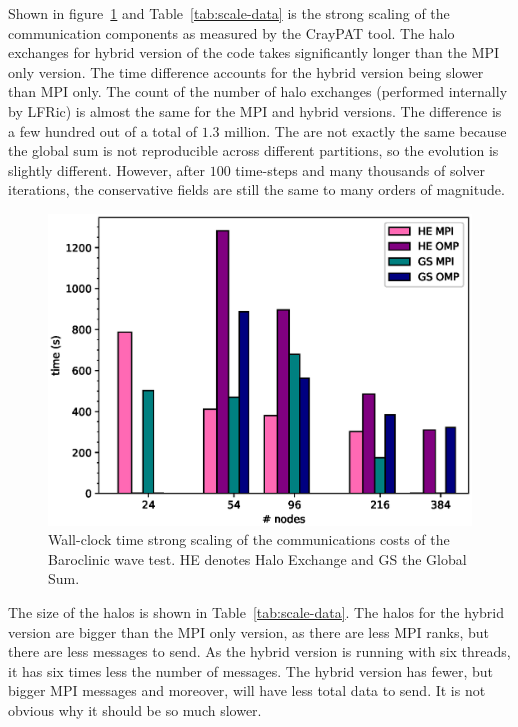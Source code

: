 Shown in figure~\ref{fig:comms_scale} and Table~\ref{tab:scale-data}
is the strong scaling of the communication components as measured by
the CrayPAT tool. The halo exchanges for hybrid version of the code
takes significantly longer than the MPI only version. The time
difference accounts for the hybrid version being slower than MPI only.
The count of the number of halo exchanges (performed internally by
LFRic) is almost the same for the MPI and hybrid versions. The
difference is a few hundred out of a total of $1.3$ million. The are
not exactly the same because the global sum is not reproducible across
different partitions, so the evolution is slightly different. However,
after $100$ time-steps and many thousands of solver iterations, the
conservative fields are still the same to many orders of magnitude.

\begin{figure}[ht!]
\centering\includegraphics[width=1.0\linewidth]{figs/comms-scale.eps}
\caption{\label{fig:comms_scale}Wall-clock time strong scaling of the 
  communications costs of the Baroclinic wave test. HE denotes Halo
  Exchange and GS the Global Sum.}
\end{figure} 

The size of the halos is shown in Table~\ref{tab:scale-data}. The 
halos for the hybrid version are bigger than the MPI only version, as 
there are less MPI ranks, but there are less messages to send. As the 
hybrid version is running with six threads, it has six times less the 
number of messages. The hybrid version has fewer, but bigger MPI 
messages and moreover, will have less total data to send. It is not 
obvious why it should be so much slower. 

